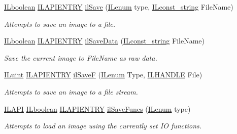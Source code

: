 \begin{DoxyCompactItemize}
\hyperlink{group__il__types_gaa6aa7c95cfdc06b4d8601ef832b7bb0a}{I\+Lboolean} \hyperlink{_i_l_8h_a69c08a8d06df986f7e46f209d131ef2f}{I\+L\+A\+P\+I\+E\+N\+T\+R\+Y} \hyperlink{group__file_ga9defa198f10b426a91f1b764f0dc4a08}{il\+Save} (\hyperlink{group__il__types_ga62ca73445716183ef42b1f3906a45ed0}{I\+Lenum} type, \hyperlink{group__il__types_ga1aa1edc3eb344e14acacb02bade24a5a}{I\+Lconst\+\_\+string} File\+Name)
\begin{DoxyCompactList}\small\item\em Attempts to save an image to a file. \end{DoxyCompactList}\item 
\hyperlink{group__il__types_gaa6aa7c95cfdc06b4d8601ef832b7bb0a}{I\+Lboolean} \hyperlink{_i_l_8h_a69c08a8d06df986f7e46f209d131ef2f}{I\+L\+A\+P\+I\+E\+N\+T\+R\+Y} \hyperlink{group__file_gabae3fa5c553904bd5ff5c7e6abc6b2c4}{il\+Save\+Data} (\hyperlink{group__il__types_ga1aa1edc3eb344e14acacb02bade24a5a}{I\+Lconst\+\_\+string} File\+Name)
\begin{DoxyCompactList}\small\item\em Save the current image to File\+Name as raw data. \end{DoxyCompactList}\item 
\hyperlink{group__il__types_gaff8e86a1072c8d7cfe387fb87c6ed8e1}{I\+Luint} \hyperlink{_i_l_8h_a69c08a8d06df986f7e46f209d131ef2f}{I\+L\+A\+P\+I\+E\+N\+T\+R\+Y} \hyperlink{group__file_gaf52fc769ac0af726bd6d0f555a86d1fe}{il\+Save\+F} (\hyperlink{group__il__types_ga62ca73445716183ef42b1f3906a45ed0}{I\+Lenum} Type, \hyperlink{_i_l_8h_a2e3e6f3fab1fa3764f0802258f702d10}{I\+L\+H\+A\+N\+D\+L\+E} File)
\begin{DoxyCompactList}\small\item\em Attempts to save an image to a file stream. \end{DoxyCompactList}\item 
\hyperlink{_i_l_8h_aedb0c8b2b033d0612e3d784d2f598758}{I\+L\+A\+P\+I} \hyperlink{group__il__types_gaa6aa7c95cfdc06b4d8601ef832b7bb0a}{I\+Lboolean} \hyperlink{_i_l_8h_a69c08a8d06df986f7e46f209d131ef2f}{I\+L\+A\+P\+I\+E\+N\+T\+R\+Y} \hyperlink{group__file_ga24f497da87676458f3913f7d2a4c0e85}{il\+Save\+Funcs} (\hyperlink{group__il__types_ga62ca73445716183ef42b1f3906a45ed0}{I\+Lenum} type)
\begin{DoxyCompactList}\small\item\em Attempts to load an image using the currently set I\+O functions. \end{DoxyCompactList}\item 

\end{DoxyCompactItemize}

